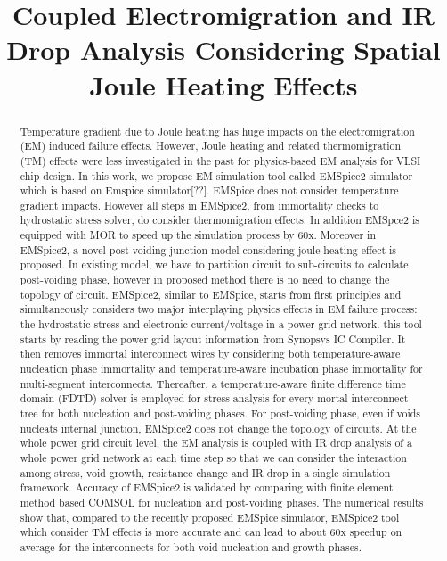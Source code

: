 \documentclass[conference]{IEEEtran}
\begin{document}
\title{Coupled Electromigration and IR Drop Analysis Considering Spatial Joule Heating
Effects}


\maketitle
\raggedbottom
\begin{abstract}
  
  Temperature gradient due to Joule heating has huge impacts on the
  electromigration (EM) induced failure effects. However, Joule
  heating and related thermomigration (TM) effects were less
  investigated in the past for physics-based EM analysis for VLSI chip
  design. In this work, we propose EM simulation tool called EMSpice2
  simulator which is based on Emspice simulator[??]. EMSpice does not consider temperature gradient impacts. However all steps in EMSpice2,
  from immortality checks to hydrostatic stress solver, do consider thermomigration effects. In addition EMSpce2 is equipped with MOR to speed up the simulation process by 60x. Moreover in EMSpice2, a novel post-voiding junction model
  considering joule heating effect is proposed.  In existing model, we have to
  partition circuit to sub-circuits to calculate post-voiding phase,
  however in proposed method there is no need to change the topology
  of circuit.
EMSpice2, similar to EMSpice, starts from first principles and simultaneously considers two major interplaying physics effects in EM failure process: the hydrostatic stress and electronic current/voltage in a power grid network. this tool starts by reading the power grid layout information from
Synopsys IC Compiler. It then removes immortal interconnect
wires by considering both temperature-aware nucleation phase immortality and temperature-aware
incubation phase immortality for multi-segment interconnects.
Thereafter, a temperature-aware finite difference time domain (FDTD) solver is
employed for stress analysis for every mortal interconnect tree
for both nucleation and post-voiding phases. For post-voiding phase, even if voids nucleats internal junction, EMSpice2 does not change the topology of circuits. At the whole power
grid circuit level, the EM analysis is coupled with IR drop
analysis of a whole power grid network at each time step so
that we can consider the interaction among stress, void growth,
resistance change and IR drop in a single simulation framework.
Accuracy of EMSpice2 is validated by comparing with finite
element method based COMSOL for nucleation and post-voiding phases.
The numerical results show
that, compared to the recently proposed EMSpice
simulator, EMSpice2 tool which consider TM effects is more accurate and can lead to about 60x speedup on
average for the interconnects for both
void nucleation and growth phases.
  

\end{abstract}
\end{document}
